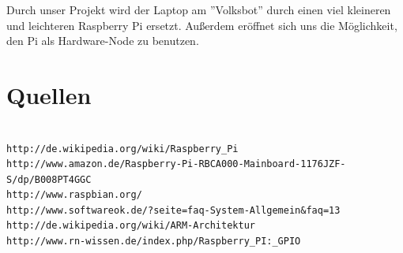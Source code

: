 \documentclass[12pt]{article}
\begin{document}
Durch unser Projekt wird der Laptop am ''Volksbot'' durch einen viel kleineren und leichteren Raspberry Pi ersetzt. Außerdem eröffnet sich uns die Möglichkeit, den Pi als Hardware-Node zu benutzen.

\section{Quellen}
\begin{verbatim}

http://de.wikipedia.org/wiki/Raspberry_Pi
http://www.amazon.de/Raspberry-Pi-RBCA000-Mainboard-1176JZF-S/dp/B008PT4GGC
http://www.raspbian.org/
http://www.softwareok.de/?seite=faq-System-Allgemein&faq=13
http://de.wikipedia.org/wiki/ARM-Architektur
http://www.rn-wissen.de/index.php/Raspberry_PI:_GPIO

\end{verbatim}
\end{document}
